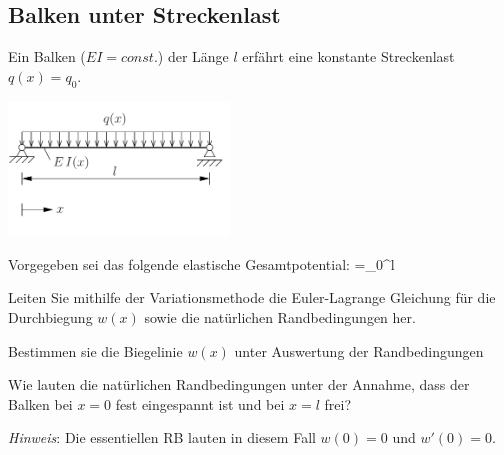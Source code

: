 \subsection{Balken unter Streckenlast}

Ein Balken ($EI=const.$) der Länge $l$ erfährt eine konstante Streckenlast $q(x)=q_0$. 

\begin{center}
\includegraphics[width=0.44\textwidth]{fig/ue2_balken_linienlast.pdf}
\end{center}

Vorgegeben sei das folgende elastische Gesamtpotential:
%
\ebn
\Pi=\int_{0}^l  
\een

\enab
\item Leiten Sie mithilfe der Variationsmethode die Euler-Lagrange Gleichung für die Durchbiegung $w(x)$ sowie die natürlichen Randbedingungen her.
\item Bestimmen sie die Biegelinie $w(x)$ unter Auswertung der Randbedingungen
\item Wie lauten die natürlichen Randbedingungen unter der Annahme, dass der Balken bei $x=0$ fest eingespannt ist und bei $x=l$ frei?
\par \textit{Hinweis}: Die essentiellen RB lauten in diesem Fall $w(0)=0$ und $w'(0)=0$.
\enae



